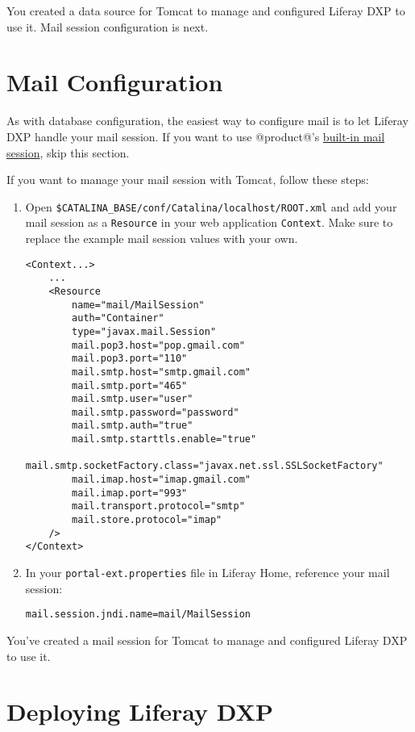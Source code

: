 You created a data source for Tomcat to manage and configured Liferay
DXP to use it. Mail session configuration is next.

\section{Mail Configuration}\label{mail-configuration}

As with database configuration, the easiest way to configure mail is to
let Liferay DXP handle your mail session. If you want to use @product@'s
\href{/docs/7-2/deploy/-/knowledge_base/d/configuring-mail}{built-in
mail session}, skip this section.

If you want to manage your mail session with Tomcat, follow these steps:

\begin{enumerate}
\def\labelenumi{\arabic{enumi}.}
\item
  Open \texttt{\$CATALINA\_BASE/conf/Catalina/localhost/ROOT.xml} and
  add your mail session as a \texttt{Resource} in your web application
  \texttt{Context}. Make sure to replace the example mail session values
  with your own.

\begin{verbatim}
<Context...>
    ...
    <Resource
        name="mail/MailSession"
        auth="Container"
        type="javax.mail.Session"
        mail.pop3.host="pop.gmail.com"
        mail.pop3.port="110"
        mail.smtp.host="smtp.gmail.com"
        mail.smtp.port="465"
        mail.smtp.user="user"
        mail.smtp.password="password"
        mail.smtp.auth="true"
        mail.smtp.starttls.enable="true"
        mail.smtp.socketFactory.class="javax.net.ssl.SSLSocketFactory"
        mail.imap.host="imap.gmail.com"
        mail.imap.port="993"
        mail.transport.protocol="smtp"
        mail.store.protocol="imap"
    />
</Context>
\end{verbatim}
\item
  In your \texttt{portal-ext.properties} file in Liferay Home, reference
  your mail session:

\begin{verbatim}
mail.session.jndi.name=mail/MailSession
\end{verbatim}
\end{enumerate}

You've created a mail session for Tomcat to manage and configured
Liferay DXP to use it.

\section{Deploying Liferay DXP}\label{deploying-liferay-dxp-1}

